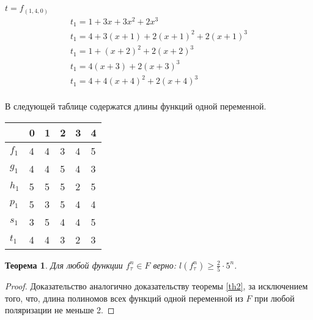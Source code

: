 \documentclass[bibliography=totoc, a4paper, 14pt]{extarticle}
\newtheorem{myth}{Теорема}
\begin{document}
$t=f_{(1,4,0)}$
$$
\begin{array}{l}
t_1 = 1 + 3x + 3x^2 + 2x^3 \\
t_1 = 4 + 3(x+1) + 2(x+1)^2 + 2(x+1)^3 \\
t_1 = 1 + (x+2)^2 + 2(x+2)^3 \\
t_1 = 4(x+3) + 2(x+3)^3 \\
t_1 = 4 + 4(x+4)^2 + 2(x+4)^3 \\
\end{array}
$$

В следующей таблице содержатся длины функций одной переменной.

\begin{center}
\begin{tabular}{| l | l | l | l | l | l |}
\hline
 & 0 & 1 & 2 & 3 & 4 \\
\hline
$f_{1}$ & 4 & 4 & 3 & 4 & 5 \\
\hline
$g_{1}$ & 4 & 4 & 5 & 4 & 3 \\
\hline
$h_{1}$ & 5 & 5 & 5 & 2 & 5 \\
\hline
$p_{1}$ & 5 & 3 & 5 & 4 & 4 \\
\hline
$s_{1}$ & 3 & 5 & 4 & 4 & 5 \\
\hline
$t_{1}$ & 4 & 4 & 3 & 2 & 3 \\
\hline
\end{tabular}
\end{center}

\begin{myth} Для любой функции $f^n_{\tau} \in F$ верно:
$l(f^n_{\tau}) \geqslant \frac{2}{5}\cdot 5^n$.
\end{myth}
\begin{proof}
Доказательство аналогично доказательству теоремы \ref{th2}, за исключением того, что,
длина полиномов всех функций одной переменной из $F$ при любой поляризации не меньше 2.
\end{proof}
\end{document}
